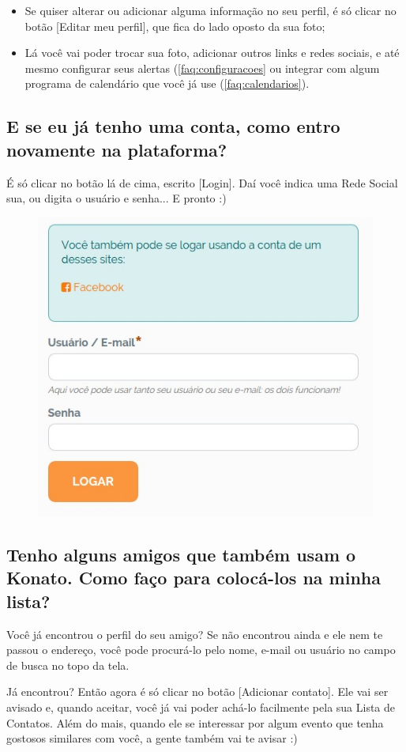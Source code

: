 \documentclass[12pt,a4paper,twoside,hyphens,english,brazil]{abntex2}
\newcommand{\adiado}{{\color{Bittersweet}\framebox[1.1\width]{ADIADO}}}
\begin{document}
{\begin{itemize}[itemsep=-0.8ex]
	\item Se quiser alterar ou adicionar alguma informação no seu perfil, é só clicar no botão [Editar meu perfil], que fica do lado oposto da sua foto;
	\item Lá você vai poder trocar sua foto, adicionar outros links e redes sociais, e até mesmo configurar seus alertas (\autoref{faq:configuracoes} ou integrar com algum programa de calendário que você já use (\autoref{faq:calendarios}).
\end{itemize}

\subsection{E se eu já tenho uma conta, como entro novamente na plataforma?}
É só clicar no botão lá de cima, escrito [Login]. Daí você indica uma Rede Social sua, ou digita o usuário e senha... E pronto :)
\begin{figure}[h!]
	\centering \includegraphics[width=0.4\linewidth]{imagens/faq/login.jpg}
	\vspace{-20pt}
\end{figure}

\subsection[Como adiciono novos contatos?]{Tenho alguns amigos que também usam o Konato. Como faço para colocá-los na minha lista?} \label{faq:contatos}
\adiado{} Você já encontrou o perfil do seu amigo? Se não encontrou ainda e ele nem te passou o endereço, você pode procurá-lo pelo nome, e-mail ou usuário no campo de busca no topo da tela.

Já encontrou? Então agora é só clicar no botão [Adicionar contato]. Ele vai ser avisado e, quando aceitar, você já vai poder achá-lo facilmente pela sua Lista de Contatos. Além do mais, quando ele se interessar por algum evento que tenha gostosos similares com você, a gente também vai te avisar :)

}
\end{document}
